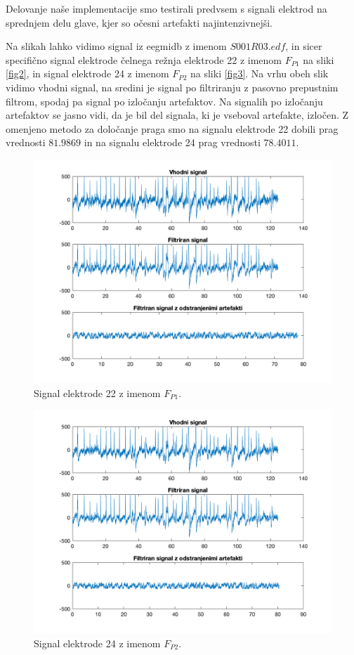 \documentclass[9pt]{IEEEtran}
\begin{document}
Delovanje naše implementacije smo testirali predvsem s signali elektrod na sprednjem delu glave, kjer so očesni artefakti najintenzivnejši. 

Na slikah lahko vidimo signal iz eegmidb z imenom $S001R03.edf$, in sicer specifično signal elektrode čelnega režnja elektrode 22 z imenom $F_{P1}$ na sliki \ref{fig2}, in signal elektrode 24 z imenom $F_{P2}$ na sliki \ref{fig3}. Na vrhu obeh slik vidimo vhodni signal, na sredini je signal po filtriranju z pasovno prepustnim filtrom, spodaj pa signal po izločanju artefaktov. Na signalih po izločanju artefaktov se jasno vidi, da je bil del signala, ki je vseboval artefakte, izločen. Z omenjeno metodo za določanje praga smo na signalu elektrode 22 dobili prag vrednosti $81.9869$ in na signalu elektrode 24 prag vrednosti $78.4011$.

\begin{figure}[!htb]
\centering
\includegraphics[width=1\columnwidth]{results22.png}
\caption[c1]{ Signal elektrode 22 z imenom $F_{P1}$.  }
\label{fig_2}
\end{figure}

\begin{figure}[!htb]
\centering
\includegraphics[width=1\columnwidth]{results24.png}
\caption[c1]{ Signal elektrode 24 z imenom $F_{P2}$.}
\label{fig_3}
\end{figure}
\end{document}
